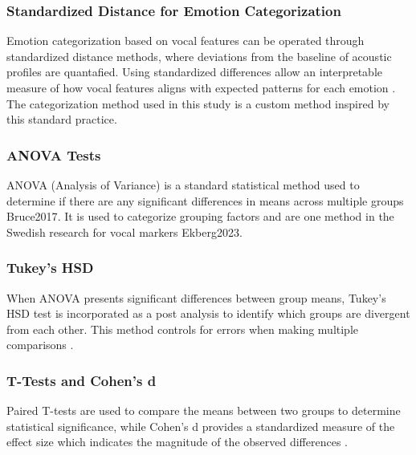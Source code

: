 \subsubsection{Standardized Distance for Emotion Categorization}
Emotion categorization based on vocal features can be operated through standardized distance methods, where deviations from the baseline of acoustic profiles are quantafied. Using standardized differences allow an interpretable measure of how vocal features aligns with expected patterns for each emotion \autocite{Ekberg2023} \autocite{Bruce2017}. 
The categorization method used in this study is a custom method inspired by this standard practice. 

\subsubsection{ANOVA Tests}
ANOVA (Analysis of Variance) is a standard statistical method used to determine if there are any significant differences in means across multiple groups {Bruce2017}. It is used to categorize grouping factors and are one method in the Swedish research for vocal markers {Ekberg2023}.  

\subsubsection{Tukey's HSD}
When ANOVA presents significant differences between group means, Tukey's HSD test is incorporated as a post analysis to identify which groups are divergent from each other. 
This method controls for errors when making multiple comparisons \autocite{Bruce2017}. 
\subsubsection{T-Tests and Cohen's d}
Paired T-tests are used to compare the means between two groups to determine statistical significance, while Cohen's d provides a standardized measure of the effect size which indicates the magnitude of the observed differences \autocite{Cohen1977} \autocite{Bruce2017}.